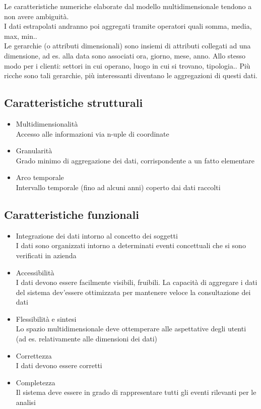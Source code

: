 Le caratteristiche numeriche elaborate dal modello multidimensionale
tendono a non avere ambiguit\`a.\\
I dati estrapolati andranno poi aggregati tramite operatori quali somma, media, max, min..\\
Le gerarchie (o attributi dimensionali) sono insiemi di attributi
collegati ad una dimensione, ad es. alla data sono associati ora,
giorno, mese, anno. Allo stesso modo per i clienti: settori in cui
operano, luogo in cui si trovano, tipologia.. Pi\`u ricche sono tali
gerarchie, pi\`u interessanti diventano le aggregazioni di questi dati.

\subsection{Caratteristiche
strutturali}\label{caratteristiche-strutturali}

\begin{itemize}

\item
  Multidimensionalit\`a\\
  Accesso alle informazioni via n-uple di coordinate
\item
  Granularit\`a\\
  Grado minimo di aggregazione dei dati, corrispondente a un fatto
  elementare
\item
  Arco temporale\\
  Intervallo temporale (fino ad alcuni anni) coperto dai dati raccolti
\end{itemize}

\subsection{Caratteristiche
funzionali}\label{caratteristiche-funzionali}

\begin{itemize}

\item
  Integrazione dei dati intorno al concetto dei soggetti\\
  I dati sono organizzati intorno a determinati eventi concettuali che
  si sono verificati in azienda
\item
  Accessibilit\`a\\
  I dati devono essere facilmente visibili, fruibili. La capacit\`a di
  aggregare i dati del sistema dev'essere ottimizzata per mantenere
  veloce la consultazione dei dati
\item
  Flessibilit\`a e sintesi\\
  Lo spazio multidimensionale deve ottemperare alle aspettative degli
  utenti (ad es. relativamente alle dimensioni dei dati)
\item
  Correttezza\\
  I dati devono essere corretti
\item
  Completezza\\
  Il sistema deve essere in grado di rappresentare tutti gli eventi
  rilevanti per le analisi
\end{itemize}

